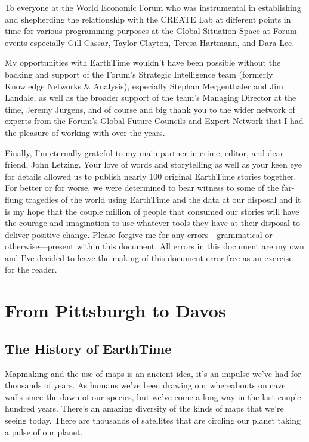 \documentclass[
]{krantz}
\begin{document}
To everyone at the World Economic Forum who was instrumental in establishing and shepherding the relationship with the CREATE Lab at different points in time for various programming purposes at the Global Situation Space at Forum events especially Gill Cassar, Taylor Clayton, Teresa Hartmann, and Dara Lee.

My opportunities with EarthTime wouldn't have been possible without the backing and support of the Forum's Strategic Intelligence team (formerly Knowledge Networks \& Analysis), especially Stephan Mergenthaler and Jim Landale, as well as the broader support of the team's Managing Director at the time, Jeremy Jurgens, and of course and big thank you to the wider network of experts from the Forum's Global Future Councils and Expert Network that I had the pleasure of working with over the years.

Finally, I'm eternally grateful to my main partner in crime, editor, and dear friend, John Letzing. Your love of words and storytelling as well as your keen eye for details allowed us to publish nearly 100 original EarthTime stories together. For better or for worse, we were determined to bear witness to some of the far-flung tragedies of the world using EarthTime and the data at our disposal and it is my hope that the couple million of people that consumed our stories will have the courage and imagination to use whatever tools they have at their disposal to deliver positive change. Please forgive me for any errors---grammatical or otherwise---present within this document. All errors in this document are my own and I've decided to leave the making of this document error-free as an exercise for the reader.

\hypertarget{part-from-pittsburgh-to-davos}{%
\part{From Pittsburgh to Davos}\label{part-from-pittsburgh-to-davos}}

\hypertarget{the-history-of-earthtime}{%
\chapter{The History of EarthTime}\label{the-history-of-earthtime}}

Mapmaking and the use of maps is an ancient idea, it's an impulse we've had for thousands of years. As humans we've been drawing our whereabouts on cave walls since the dawn of our species, but we've come a long way in the last couple hundred years. There's an amazing diversity of the kinds of maps that we're seeing today. There are thousands of satellites that are circling our planet taking a pulse of our planet.
\end{document}
